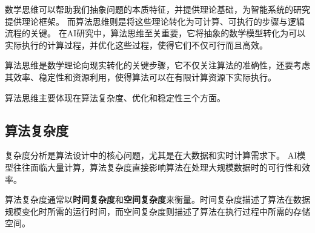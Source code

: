 数学思维可以帮助我们抽象问题的本质特征，并提供理论基础，为智能系统的研究提供理论框架。
而算法思维则是将这些理论转化为可计算、可执行的步骤与逻辑流程的关键。
在AI研究中，算法思维至关重要，它将抽象的数学模型转化为可以实际执行的计算过程，并优化这些过程，使得它们不仅可行而且高效。

算法思维是数学理论向现实转化的关键步骤，它不仅关注算法的准确性，还要考虑其效率、稳定性和资源利用，使得算法可以在有限计算资源下实际执行。

算法思维主要体现在算法复杂度、优化和稳定性三个方面。

\subsection{算法复杂度}
复杂度分析是算法设计中的核心问题，尤其是在大数据和实时计算需求下。
AI模型往往面临大量计算，算法复杂度直接影响算法在处理大规模数据时的可行性和效率。

算法复杂度通常以{\bf 时间复杂度}和{\bf 空间复杂度}来衡量。时间复杂度描述了算法在数据规模变化时所需的运行时间，而空间复杂度则描述了算法在执行过程中所需的存储空间。

